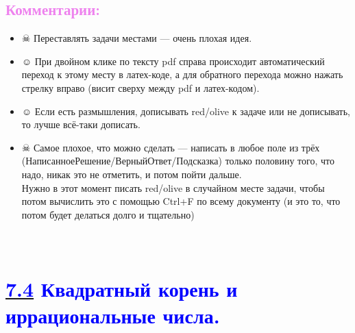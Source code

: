 \documentclass[12pt]{article}
\newcounter{num}
\newenvironment{mylist} %
{ \begin{itemize}
    \setlength{\itemsep}{0pt}
    \setlength{\parskip}{0pt}
    \setlength{\parsep}{0pt}     }
{ \end{itemize}                  }
\begin{document}
\subsection*{\textcolor{Violet}{\textbf{Комментарии:}}}%
\begin{mylist}
\item [$\skull$] Переставлять задачи местами --- очень плохая идея.

\item [$\smiley$] При двойном клике по тексту pdf справа происходит автоматический переход к этому месту в латех-коде, а для обратного перехода можно нажать стрелку вправо (висит сверху между pdf и латех-кодом).

\item [$\smiley$] Если есть размышления, дописывать red/olive к задаче или не дописывать, то лучше всё-таки дописать.

\item [$\skull$] Самое плохое, что можно сделать --- написать в любое поле из трёх (НаписанноеРешение/ВерныйОтвет/Подсказка) только половину того, что надо, никак это не отметить, и потом пойти дальше.\\ Нужно в этот момент писать red/olive в случайном месте задачи, чтобы потом вычислить это с помощью Ctrl+F по всему документу (и это то, что потом будет делаться долго и тщательно)
\end{mylist}

\newpage
\setcounter{num}{583}

\hypertarget{7.4}{{\centering\section*{\bigskip\\\textcolor{Blue}{\hyperlink{start2}{\textcolor{Blue}{7.4}} Квадратный корень и иррациональные числа.}\vspace{-5mm}}}}
\end{document}
